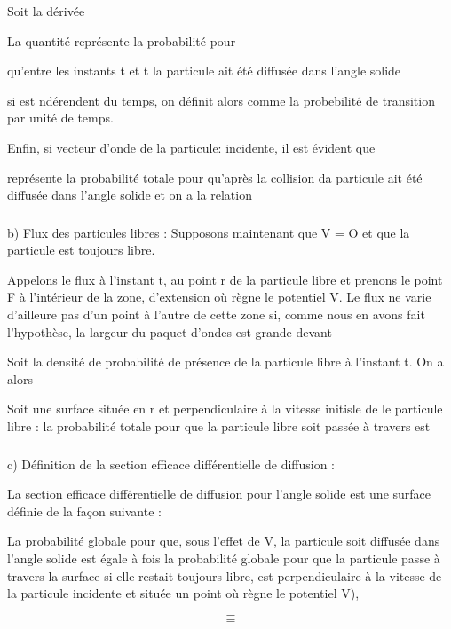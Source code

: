 Soit  la dérivée 

La quantité  représente la probabilité pour

qu'entre les instants t et t  la particule ait été diffusée dans
l'angle solide 

si  est ndérendent du temps, on définit alors 
comme la probebilité  de transition par unité de temps.

Enfin, si  vecteur d'onde de la particule: incidente, il
est évident que 

 représente la probabilité totale pour qu'après
la collision da particule ait été diffusée dans l'angle solide 
et on a la relation


\subsubsection{}%
b) Flux des particules libres :
Supposons maintenant que V = O et que la particule est
toujours libre.

 Appelons le flux à l'instant t, au point r de la
particule libre et prenons le point F à l'intérieur de la zone, d'extension
où règne le potentiel V. Le flux  ne varie d'ailleure pas
d'un point à l'autre de cette zone si, comme nous en avons fait l'hypothèse,
la largeur du paquet d'ondes est grande devant

Soit  la densité de probabilité de présence de la
particule libre  à l'instant t. On a alors

Soit  une surface située en r et perpendiculaire à la vitesse initisle
de le particule libre : la probabilité totale pour que la particule
libre soit passée à travers  est

\subsubsection{}%
c) Définition de la section efficace différentielle de diffusion :

La section efficace différentielle de diffusion pour
l'angle solide  est une surface  définie de la façon suivante :

La probabilité globale pour que, sous l'effet de V, la particule soit diffusée
dans l'angle solide  est égale à  fois
la probabilité globale pour que la particule passe à travers la surface
 si elle restait toujours libre,  est perpendiculaire à la
vitesse de la particule incidente et située  un point  où règne le
potentiel V),

\[
\tag{49}=
\]
\[
\tag{50}=
\]

